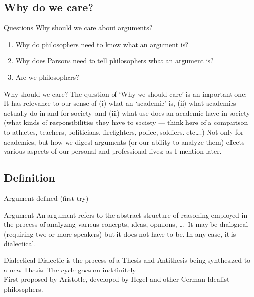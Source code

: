 \documentclass{beamer}
\begin{document}
\subsection{Why do we care?}
\begin{frame}{Questions}\label{whycare}
Why should we care about arguments?
\begin{enumerate}
\item Why do philosophers need to know what an argument is?
\item Why does Parsons need to tell philosophers what an argument is? 
\item Are we philosophers?
\end{enumerate}
\end{frame}

\begin{frame}{Why should we care?}
The question of `Why we should care' is an important one: It has relevance to our sense of (i) what an `academic' is, (ii) what academics actually do in and for society, and (iii) what use does an academic have in society (what kinds of responsibilities they have to society --- think here of a comparison to athletes, teachers, politicians, firefighters, police, soldiers. etc\ldots.)
Not only for academics, but how we digest arguments (or our ability to analyze them) effects various aspects of our personal and professional lives; as I mention later.
\end{frame}

\subsection{Definition}
\begin{frame}{Argument defined (first try)}
\begin{exampleblock}{\sc Argument}
An argument refers to the abstract structure of reasoning employed in the process of analyzing various concepts, ideas, opinions, \ldots. It may be dialogical (requiring two or more speakers) but it does not have to be. In any case, it is dialectical.
\end{exampleblock}
\begin{block}{Dialectical}
Dialectic is the process of a Thesis and Antithesis being synthesized to a new Thesis. The cycle goes on indefinitely.\\ First proposed by Aristotle, developed by Hegel and other German Idealist philosophers.
\end{block}
 \end{frame}\label{firsttry}
\end{document}
